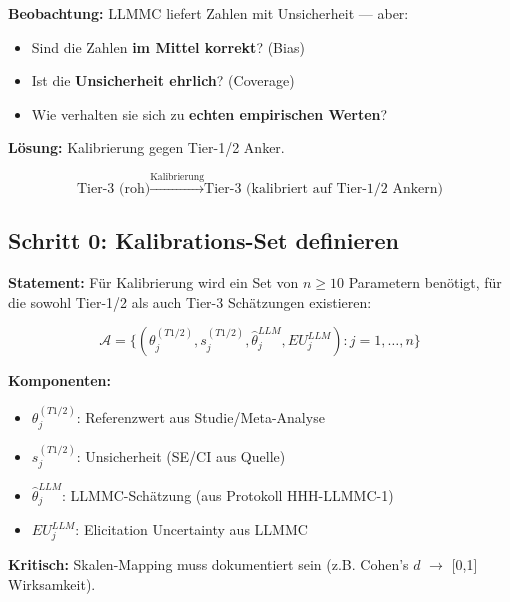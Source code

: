 \begin{tcolorbox}[colback=red!5!white, colframe=red!75!black,
    title=\textbf{Das Problem: Unkalibrierte LLM-Schätzungen}]

\textbf{Beobachtung:} LLMMC liefert Zahlen mit Unsicherheit --- aber:
\begin{itemize}[nosep]
    \item Sind die Zahlen \textbf{im Mittel korrekt}? (Bias)
    \item Ist die \textbf{Unsicherheit ehrlich}? (Coverage)
    \item Wie verhalten sie sich zu \textbf{echten empirischen Werten}?
\end{itemize}

\textbf{Lösung:} Kalibrierung gegen Tier-1/2 Anker.

\begin{equation*}
\boxed{\text{Tier-3 (roh)} \xrightarrow{\text{Kalibrierung}} \text{Tier-3 (kalibriert auf Tier-1/2 Ankern)}}
\end{equation*}

\end{tcolorbox}

\subsection{Schritt 0: Kalibrations-Set definieren}

\begin{tcolorbox}[colback=gray!5!white, colframe=gray!75!black,
    title=\textbf{Axiom CAL-1: Kalibrations-Anker-Anforderung}]

\textbf{Statement:} Für Kalibrierung wird ein Set von $n \geq 10$ Parametern benötigt, für die sowohl Tier-1/2 als auch Tier-3 Schätzungen existieren:

\begin{equation}
\mathcal{A} = \{(\theta_j^{(T1/2)}, s_j^{(T1/2)}, \hat{\theta}_j^{LLM}, EU_j^{LLM}) : j = 1, \ldots, n\}
\end{equation}

\textbf{Komponenten:}
\begin{itemize}[nosep]
    \item $\theta_j^{(T1/2)}$: Referenzwert aus Studie/Meta-Analyse
    \item $s_j^{(T1/2)}$: Unsicherheit (SE/CI aus Quelle)
    \item $\hat{\theta}_j^{LLM}$: LLMMC-Schätzung (aus Protokoll HHH-LLMMC-1)
    \item $EU_j^{LLM}$: Elicitation Uncertainty aus LLMMC
\end{itemize}

\textbf{Kritisch:} Skalen-Mapping muss dokumentiert sein (z.B. Cohen's $d$ $\rightarrow$ [0,1] Wirksamkeit).

\end{tcolorbox}

